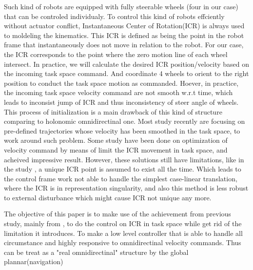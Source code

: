 Such kind of robots are equipped with fully steerable wheels (four in our case) that can be controled individualy. To control this kind of robots effciently without actuator conflict, Instantaneous Center of 
Rotation(ICR) is always used to moldeling the kinematics. This ICR is defined as being the point in the robot frame that instantaneously does not move in relation to the robot. For our case, the ICR 
corresponds to the point where the zero motion line of each wheel intersect. In practice, we will calculate the desired ICR position/velocity based on the incoming task space command. And coordinate 4 wheels to 
orient to the right position to conduct the task space motion as commanded. Hoever, in practice, the incoming task space velocity command are not smooth w.r.t time, which leads to inconsist jump of ICR and thus
inconsistency of steer angle of wheels. This process of initialization is a main drawback of this kind of structure comparing to holonomic omnidirectinal one. Most study recently are focusing on pre-defined 
trajectories whose velocity has been smoothed in the task space\cite{dietrich2011singularity}\cite{sorour2016kinematic}, to work around such problem. Some study have been done on optimization of velocity command
by means of limit the ICR movement in task space\cite{sorour2016motion}\cite{sorour2019complementary}, and acheived impressive result. However, these solutions still have limitations, like in the study 
\cite{sorour2016motion}, a unique ICR point is assumed to exist all the time. Which leads to the control frame work not able to handle the simplest case-linear translation, where the ICR is in representation 
singularity, and also this method is less robust to external disturbance which might cause ICR not unique any more.


The objective of this paper is to make use of the achievement from previous study, mainly from \cite{sorour2016motion}, to do the control on ICR in task space while get rid of the limitation it introduces. To
make a low level controller that is able to handle all circumstance and highly responsive to omnidirectinal velocity commands. Thus can be treat as a "real omnidirectinal" structure by the global plannar(navigation)

